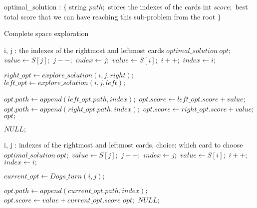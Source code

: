 \documentclass{article}
\begin{document}
\begin{algorithm}[H]
\begin{algorithmic} 
    \State optimal\_solution : $\{$
    \State \quad string $path;$ \Comment stores the indexes of the cards
    \State \quad int $score;$ \Comment best total score that we can have reaching this sub-problem from the root
\State $\}$
\end{algorithmic}
\end{algorithm}

\begin{algorithm}[H]
\begin{algorithmic} 
\caption{Complete space exploration}
 \Comment i, j : the indexes of the rightmost and leftmost cards
  \State $optimal\_solution\ opt;$
    \State $value \leftarrow S[j];$
    \State $j--;$
    \State $index \leftarrow j;$
   \Else
    \State $value \leftarrow S[i];$
    \State $i++;$
    \State $index \leftarrow i;$
  \EndIf
  
   \State $right\_opt \leftarrow explore\_solution(i, j, right);$
    \State $left\_opt \leftarrow explore\_solution(i, j, left);$
  
    \State $opt.path \leftarrow append(left\_opt.path, index);$
    \State $opt.score  \leftarrow left\_opt.score + value;$
   \Else
    \State $opt.path \leftarrow append(right\_opt.path, index);$
    \State $opt.score \leftarrow right\_opt.score + value;$
  \EndIf
  \State \Return $opt ;$
  
 \Else
 \State \Return $NULL;$
 \EndIf
\EndProcedure
\end{algorithmic}
\end{algorithm}


\begin{algorithm}[H]
\begin{algorithmic} 
\caption{}
 \Comment i, j : indexes of the rightmost and leftmost cards, choice: which card to choose
  \State $optimal\_solution\ opt;$
    \State $value \leftarrow S[j];$
    \State $j--;$
    \State $index \leftarrow j;$
   \Else
    \State $value \leftarrow S[i];$
    \State $i++;$
    \State $index \leftarrow i;$
  \EndIf
  
  $current\_opt \leftarrow Dogs\_turn(i,j);$
  
  \State $opt.path \leftarrow append(current\_opt.path, index);$
  \State $opt.score  \leftarrow value + current\_opt.score $
  \State \Return $opt;$
 \Else
 \State \Return $NULL;$
 \EndIf
 
\EndProcedure
\end{algorithmic}
\end{algorithm}
\end{document}
